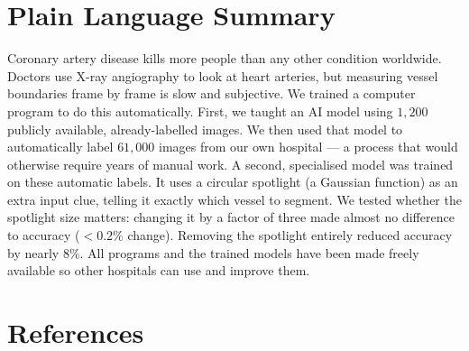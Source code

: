 \documentclass[12pt]{article}
\begin{document}
\section*{Plain Language Summary}

Coronary artery disease kills more people than any other condition worldwide.
Doctors use X-ray angiography to look at heart arteries, but measuring vessel
boundaries frame by frame is slow and subjective. We trained a computer program
to do this automatically. First, we taught an AI model using $1{,}200$ publicly
available, already-labelled images. We then used that model to automatically
label $61{,}000$ images from our own hospital — a process that would otherwise
require years of manual work. A second, specialised model was trained on these
automatic labels. It uses a circular spotlight (a Gaussian function) as an
extra input clue, telling it exactly which vessel to segment. We tested whether
the spotlight size matters: changing it by a factor of three made almost no
difference to accuracy ($<0.2\%$ change). Removing the spotlight entirely
reduced accuracy by nearly $8\%$. All programs and the trained models have been
made freely available so other hospitals can use and improve them.

\section*{References}
\end{document}
